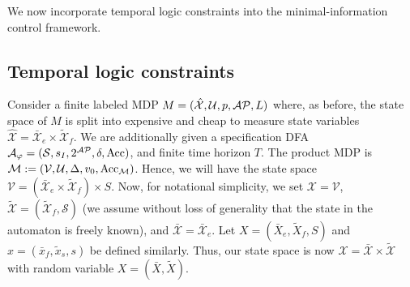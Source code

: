 We now incorporate temporal logic constraints into the minimal-information control framework.
\subsection{Temporal logic constraints}
Consider a finite labeled MDP $M=(\mathcal{\hat{X}},\mathcal{U},p,\mathcal{AP},L)$ where, as before, the state space of $M$ is split into expensive and cheap to measure state variables $\mathcal{\hat{X}} = \mathcal{\bar{X}}_e \times \mathcal{\tilde{X}}_f$. We are additionally given a specification DFA $\mathcal{A}_{\varphi} = (\mathcal{S},s_I,2^{\mathcal{AP}}, \delta,\textrm{Acc})$, and finite time horizon $T$. The product MDP is $\mathcal{M}:= (\mathcal{V},\mathcal{U}, \Delta,v_0,\textrm{Acc}_{\mathcal{M}})$.  Hence, we will have the state space $\mathcal{V} = (\mathcal{\bar{X}}_e \times \mathcal{\tilde{X}}_f) \times S$. Now, for notational simplicity, we set $\mathcal{X} = \mathcal{V}$, $\mathcal{\tilde{X}} = (\mathcal{\tilde{X}}_f,\mathcal{S})$ (we assume without loss of generality that the state in the automaton is freely known), and $\mathcal{\bar{X}} = \mathcal{\bar{X}}_e$. Let $X = (\bar{X}_e,\tilde{X}_f,S)$ and $x = (\bar{x}_f,\tilde{x}_s,s)$ be defined similarly. Thus, our state space is now $\mathcal{X}= \mathcal{\bar{X}} \times \mathcal{\tilde{X}}$ with random variable $X = (\bar{X},\tilde{X})$. 

